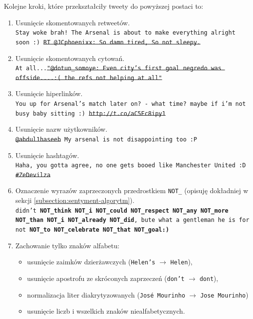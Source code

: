 \clearpage
Kolejne kroki, które przekształciły tweety do powyższej postaci to:
\begin{enumerate}
  \item Usunięcie skomentowanych retweetów.\\
  \texttt{Stay woke brah! The Arsenal is about to make everything
  alright soon :) \sout{RT @JCphoenixx: So damn tired, So not sleepy.}}
  
  \item Usunięcie skomentowanych cytowań. \\
  \texttt{At all...\sout{"@dotun\_somoye: Even city's first goal
  negredo was offside....:( the refs not helping at all"} }
  
  \item Usunięcie hiperlinków.\\
  \texttt{You up for Arsenal's match later on? - what time? maybe if i'm not
  busy baby sitting :) \sout{http://t.co/aC5Ec8ipy1}}
 
  
  \item Usunięcie nazw użytkowników.\\
  \texttt{\sout{@abdul1haseeb} My arsenal is not disappointing too :P}
  
  
  \item Usunięcie hashtagów. \\
  \texttt{Haha, you gotta agree, no one gets booed like Manchester United :D
  \sout{\#ZeDevilza}}
  
  
  \item Oznaczenie wyrazów zaprzeczonych przedrostkiem \texttt{NOT\_} (opisuję
  dokładniej w sekcji \ref{subsection:sentyment-algorytm}). \\
  \texttt{didn't \textbf{NOT\_think NOT\_i NOT\_could NOT\_respect NOT\_any 
  NOT\_more NOT\_than NOT\_i NOT\_already NOT\_did}, bute what a gentleman he 
  is for not \textbf{NOT\_to NOT\_celebrate NOT\_that NOT\_goal:)}}

 \item Zachowanie tylko znaków alfabetu:
  	\begin{itemize}
  		\item usunięcie zaimków dzierżawczych (\texttt{Helen's} $\to$ \texttt{Helen}),
  		\item usunięcie apostrofu ze skróconych zaprzeczeń (\texttt{don't} $\to$ \texttt{dont}),
  		\item normalizacja liter diakrytyzowanych (\texttt{José Mourinho} $\to$ \texttt{Jose
  		Mourinho})
  		\item usunięcie liczb i wszelkich znaków niealfabetycznych.
	\end{itemize}


\end{enumerate}
